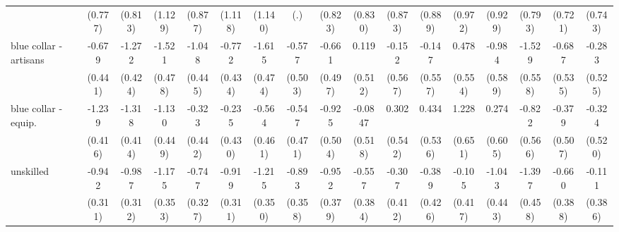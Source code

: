 {\begin{tabular}{l*{16}{c}}
                    &     (0.777)         &     (0.813)         &     (1.129)         &     (0.877)         &     (1.118)         &     (1.140)         &         (.)         &     (0.823)         &     (0.830)         &     (0.873)         &     (0.889)         &     (0.972)         &     (0.929)         &     (0.793)         &     (0.721)         &     (0.743)         \\
[1em]
blue collar - artisans&      -0.679         &      -1.272\sym{**} &      -1.521\sym{**} &      -1.048\sym{*}  &      -0.772         &      -1.615\sym{***}&      -0.577         &      -0.661         &       0.119         &      -0.152         &      -0.147         &       0.478         &      -0.984         &      -1.529\sym{**} &      -0.687         &      -0.283         \\
                    &     (0.441)         &     (0.424)         &     (0.478)         &     (0.445)         &     (0.434)         &     (0.474)         &     (0.503)         &     (0.497)         &     (0.512)         &     (0.567)         &     (0.557)         &     (0.554)         &     (0.589)         &     (0.558)         &     (0.535)         &     (0.525)         \\
[1em]
blue collar - equip.&      -1.239\sym{**} &      -1.318\sym{**} &      -1.130\sym{*}  &      -0.323         &      -0.235         &      -0.564         &      -0.547         &      -0.925         &     -0.0847         &       0.302         &       0.434         &       1.228         &       0.274         &      -0.822         &      -0.379         &      -0.324         \\
                    &     (0.416)         &     (0.414)         &     (0.449)         &     (0.442)         &     (0.430)         &     (0.461)         &     (0.471)         &     (0.504)         &     (0.518)         &     (0.542)         &     (0.536)         &     (0.651)         &     (0.605)         &     (0.566)         &     (0.507)         &     (0.520)         \\
[1em]
unskilled           &      -0.942\sym{**} &      -0.987\sym{**} &      -1.175\sym{***}&      -0.747\sym{*}  &      -0.919\sym{**} &      -1.215\sym{***}&      -0.893\sym{*}  &      -0.952\sym{*}  &      -0.557         &      -0.307         &      -0.389         &      -0.105         &      -1.043\sym{*}  &      -1.397\sym{**} &      -0.660         &      -0.111         \\
                    &     (0.311)         &     (0.312)         &     (0.353)         &     (0.327)         &     (0.311)         &     (0.350)         &     (0.358)         &     (0.379)         &     (0.384)         &     (0.412)         &     (0.426)         &     (0.417)         &     (0.443)         &     (0.458)         &     (0.388)         &     (0.386)         \\

\end{tabular}}

